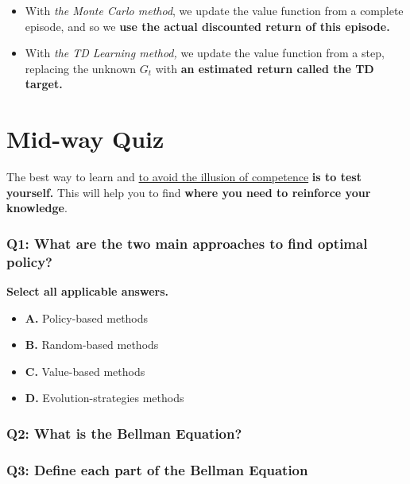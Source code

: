 \documentclass[11pt,a4paper]{article}
\begin{document}
\begin{itemize}
\tightlist
\item
  With \emph{the Monte Carlo method}, we update the value function from a complete episode, and so we \textbf{use the actual discounted return of this episode.}
\item
  With \emph{the TD Learning method,} we update the value function from a step, replacing the unknown \(G_t\) with \textbf{an estimated return called the TD target.}
\end{itemize}


\section{Mid-way Quiz}\label{mid-way-quiz}

The best way to learn and \href{https://www.coursera.org/lecture/learning-how-to-learn/illusions-of-competence-BuFzf}{to avoid the illusion of competence} \textbf{is to test yourself.} This will help you to find \textbf{where you need to reinforce your knowledge}.

\subsubsection{Q1: What are the two main approaches to find optimal policy?}\label{q1-what-are-the-two-main-approaches-to-find-optimal-policy}

\textbf{Select all applicable answers.}

\begin{itemize}
\tightlist
\item
  \textbf{A.} Policy-based methods
\item
  \textbf{B.} Random-based methods
\item
  \textbf{C.} Value-based methods
\item
  \textbf{D.} Evolution-strategies methods
\end{itemize}

\subsubsection{Q2: What is the Bellman Equation?}\label{q2-what-is-the-bellman-equation}

\subsubsection{Q3: Define each part of the Bellman Equation}\label{q3-define-each-part-of-the-bellman-equation}
\end{document}
